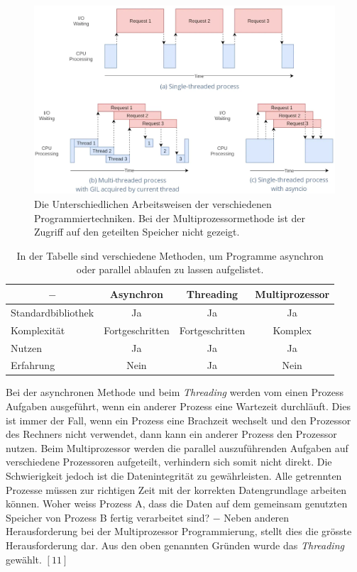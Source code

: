\begin{figure}[H]
    \centering
    \includegraphics[scale=0.4]{98_images/thread_vs_async_vs_single.png}  %
    \caption{Die Unterschiedlichen Arbeitsweisen der verschiedenen Programmiertechniken. Bei der Multiprozessormethode ist der Zugriff auf den geteilten Speicher nicht gezeigt.}
    \label{fig:multi_threading_async}
\end{figure}

\begin{table}[H]
    \centering
    \begin{tabular}{l|c|c|c}
         \multicolumn{1}{c|}{$-$}&   \textbf{Asynchron}& \textbf{Threading}& \textbf{Multiprozessor}\\
         \hline
         Standardbibliothek&        Ja&                 Ja&                 Ja\\
         Komplexität&               Fortgeschritten&    Fortgeschritten&    Komplex\\
         Nutzen&                    Ja&                 Ja&                 Ja\\
         Erfahrung&                 Nein&               Ja&                 Nein
    \end{tabular}
    \caption{In der Tabelle sind verschiedene Methoden, um Programme asynchron oder parallel ablaufen zu lassen aufgelistet.}
    \label{tab:async_threading_multiprocessor}
\end{table}

Bei der asynchronen Methode und beim \textit{Threading} werden vom einen Prozess Aufgaben ausgeführt, wenn ein anderer Prozess eine Wartezeit durchläuft. Dies ist immer der Fall, wenn ein Prozess eine Brachzeit wechselt und  den Prozessor des Rechners nicht verwendet, dann kann ein anderer Prozess den Prozessor nutzen. Beim Multiprozessor werden die parallel auszuführenden Aufgaben auf verschiedene Prozessoren aufgeteilt, verhindern sich somit nicht direkt. Die Schwierigkeit jedoch ist die Datenintegrität zu gewährleisten. Alle getrennten Prozesse müssen zur richtigen Zeit mit der korrekten Datengrundlage arbeiten können. Woher weiss Prozess A, dass die Daten auf dem gemeinsam genutzten Speicher von Prozess B fertig verarbeitet sind? $-$ Neben anderen Herausforderung bei der Multiprozessor Programmierung, stellt dies die grösste Herausforderung dar. Aus den oben genannten Gründen wurde das \textit{Threading} gewählt. $[11]$

